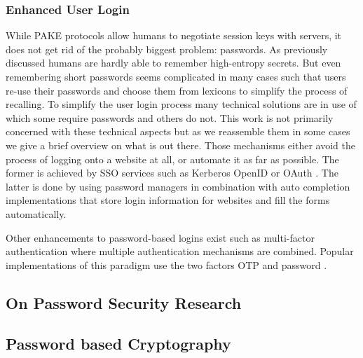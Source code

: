 \subsubsection{Enhanced User Login} \label{sec:enhanced-login}
While \acl{PAKE} protocols allow humans to negotiate session keys with servers, it does not get rid of the probably biggest problem: passwords.
As previously discussed humans are hardly able to remember high-entropy secrets.
But even remembering short passwords seems complicated in many cases such that users re-use their passwords and choose them from lexicons to simplify the process of recalling.
To simplify the user login process many technical solutions are in use of which some require passwords and others do not.
This work is not primarily concerned with these technical aspects but as we reassemble them in some cases we give a brief overview on what is out there.
Those mechanisms either avoid the process of logging onto a website at all, or automate it as far as possible.
The former is achieved by \ac{SSO} services such as Kerberos \cite{rfc4120} OpenID \cite{OpenID} or OAuth \cite{rfc6749}.
The latter is done by using password managers in combination with auto completion implementations that store login information for websites and fill the forms automatically.

Other enhancements to password-based logins exist such as multi-factor authentication \cite{FleischhackerMA14} where multiple authentication mechanisms are combined.
Popular implementations of this paradigm use the two factors \ac{OTP} and password \cite{Google2Factor,FB2Factor,Twitter2Factor,Github2Factor}.


\subsection{On Password Security Research}

\subsection{Password based Cryptography}


